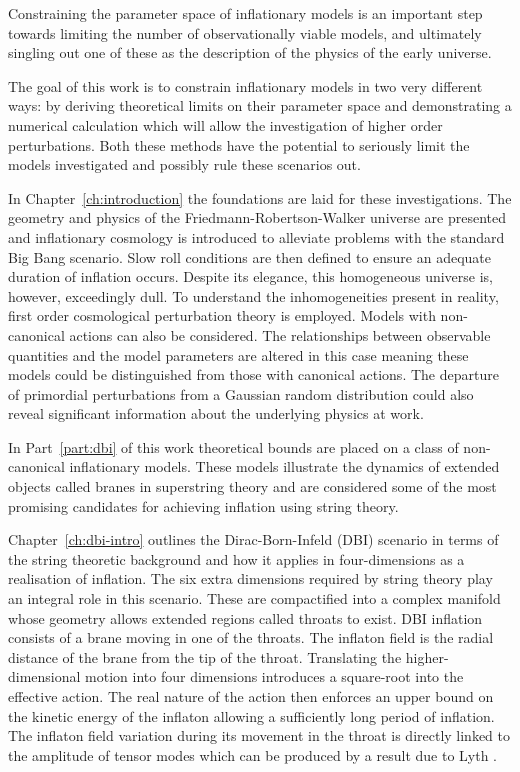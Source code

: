 Constraining the parameter space of inflationary models is an important step
towards limiting the number of observationally viable models, and ultimately
singling out one of these as the description of the physics of the early
universe. 

The goal of this work is to constrain inflationary models in two very different
ways: by deriving theoretical limits on their parameter space and demonstrating
a numerical calculation which will allow the investigation of higher order
perturbations. Both these methods have the potential to seriously limit the
models investigated and possibly rule these scenarios out.


In Chapter~\ref{ch:introduction} the foundations are laid for these investigations.
The geometry and physics of the Friedmann-Robertson-Walker universe are presented and
inflationary cosmology is introduced to alleviate problems with the standard Big
Bang scenario. Slow roll conditions are then defined to ensure an adequate duration
of inflation occurs. Despite its elegance, this homogeneous universe is, however,
exceedingly dull. To understand the inhomogeneities present in reality, first order
cosmological perturbation theory is employed. Models with non-canonical
actions can also be considered. The relationships between observable quantities and
the model parameters are altered in this case meaning these models could be
distinguished from those with canonical actions. The departure of primordial
perturbations from a Gaussian random distribution could also reveal significant
information about the underlying physics at work.


In Part~\ref{part:dbi} of this work theoretical bounds are placed on a class of
non-canonical inflationary models. These models illustrate the dynamics of
extended objects called branes in superstring theory and are considered some of
the most promising candidates for achieving inflation using string theory.

Chapter~\ref{ch:dbi-intro} outlines the Dirac-Born-Infeld (DBI) scenario in
terms of the string theoretic background and how it applies in four-dimensions
as a realisation of inflation. The six extra dimensions required by string theory
play an integral role in this scenario. These are compactified into a complex
manifold whose geometry allows extended regions called throats to exist. DBI
inflation consists of a brane moving in one of the throats. The inflaton field is
the radial distance of the brane from the tip of the throat. Translating the
higher-dimensional motion into four dimensions introduces a square-root into the
effective action. The real nature of the action then enforces an upper bound on the
kinetic energy of the inflaton allowing a sufficiently long period of inflation. The
inflaton field variation during its movement in the throat is directly linked to the
amplitude of tensor modes which can be produced by a result due to Lyth
\cite{lyth}.


